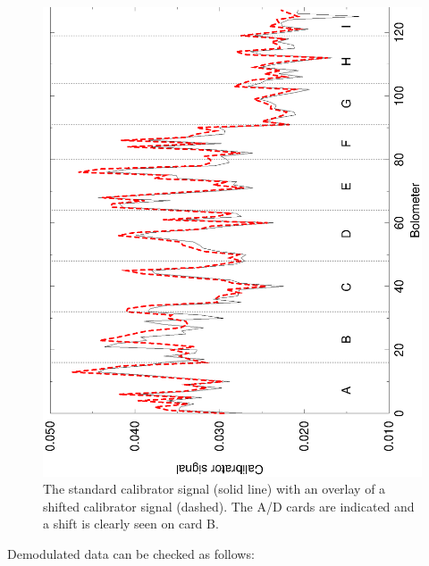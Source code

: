 \documentclass[twoside,11pt]{article}
\renewcommand{\_}{\texttt{\symbol{95}}}
\begin{document}
\begin{figure}
\begin{center}
\includegraphics[width=5in,angle=-90]{sun216_shift_diag.eps}
\caption{The standard calibrator signal (solid line) with an overlay of a
shifted calibrator signal (dashed). The A/D cards are indicated and a shift
is clearly seen on card B.}
\label{scushift_fig}
\end{center}
\end{figure}


Demodulated data can be checked as follows:
\end{document}
